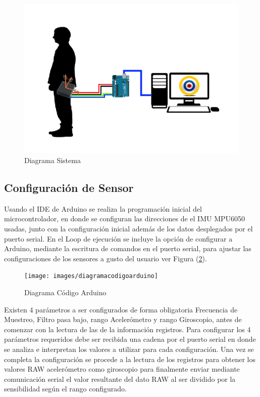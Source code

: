 \documentclass[12pt,a4paper]{article}
\begin{document}
\begin{figure}[H]
\centering
\includegraphics[scale=0.2]{images/diagrama_sistema}
\caption{Diagrama Sistema}
\label{fig:diagramasistema}
\end{figure}

\subsection{Configuración de Sensor}
Usando el IDE de Arduino se realiza la programación inicial del microcontrolador, en donde se configuran las direcciones de el IMU MPU6050 usadas, junto con la configuración inicial además de los datos desplegados por el puerto serial.
  En el Loop de ejecución se incluye la opción de configurar a Arduino, mediante la escritura de comandos en el puerto serial, para ajustar las configuraciones de los sensores a gusto del usuario ver Figura (\ref{fig:arduinocode}).

\begin{figure}[H]
\centering
	\texttt{[image: images/diagramacodigoarduino]}
	\caption{Diagrama Código Arduino}
	\label{fig:arduinocode}
\end{figure}
  
  Existen 4 parámetros a ser configurados de forma obligatoria Frecuencia de Muestreo, Filtro pasa bajo, rango Acelerómetro y  rango Giroscopio, antes de comenzar con la lectura de las de la información registros.
Para configurar los 4 parámetros requeridos debe ser recibida una cadena por el puerto serial en donde se analiza e interpretan los valores a utilizar para cada configuración. 
Una vez se completa la configuración se procede a la lectura de los registros para obtener los valores RAW acelerómetro como giroscopio para finalmente enviar mediante comunicación serial el valor resultante del dato RAW al ser dividido por la sensibilidad según el rango configurado.
\end{document}
